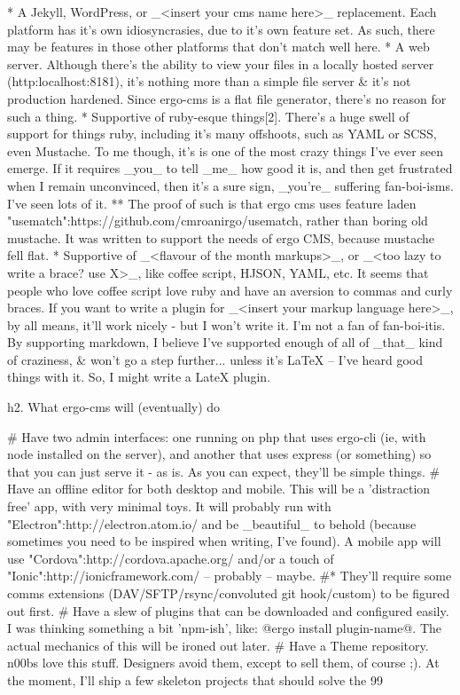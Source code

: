 * A Jekyll, WordPress, or _<insert your cms name here>_ replacement. Each platform has it's own idiosyncrasies, due to it's own feature set. As such, there may be features in those other platforms that don't match well here.
* A web server. Although there's the ability to view your files in a locally hosted server (http:localhost:8181), it's nothing more than a simple file server & it's not production hardened. Since ergo-cms is a flat file generator, there's no reason for such a thing.
* Supportive of ruby-esque things[2]. There's a huge swell of support for things ruby, including it's many offshoots, such as YAML or SCSS, even Mustache. To me though, it's is one of the most crazy things I've ever seen emerge. If it requires _you_ to tell _me_ how good it is, and then get frustrated when I remain unconvinced, then it's a sure sign, _you're_ suffering fan-boi-isms. I've seen lots of it.
** The proof of such is that ergo cms uses feature laden "usematch":https://github.com/cmroanirgo/usematch, rather than boring old mustache. It was written to support the needs of ergo CMS, because mustache fell flat.
* Supportive of _<flavour of the month markups>_, or _<too lazy to write a brace? use X>_, like coffee script, HJSON, YAML, etc. It seems that people who love coffee script love ruby and have an aversion to commas and curly braces. If you want to write a plugin for _<insert your markup language here>_, by all means, it'll work nicely - but I won't write it. I'm not a fan of fan-boi-itis. By supporting markdown, I believe I've supported enough of all of _that_ kind of craziness, & won't go a step further... unless it's LaTeX -- I've heard good things with it. So, I might write a LateX plugin. 



h2. What ergo-cms will (eventually) do

# Have two admin interfaces: one running on php that uses ergo-cli (ie, with node installed on the server), and another that uses express (or something) so that you can just serve it - as is. As you can expect, they'll be simple things.
# Have an offline editor for both desktop and mobile. This will be a 'distraction free' app, with very minimal toys. It will probably run with "Electron":http://electron.atom.io/ and be _beautiful_ to behold (because sometimes you need to be inspired when writing, I've found). A mobile app will use "Cordova":http://cordova.apache.org/ and/or a touch of "Ionic":http://ionicframework.com/ -- probably -- maybe. 
#* They'll require some comms extensions (DAV/SFTP/rsync/convoluted git hook/custom) to be figured out first.
# Have a slew of plugins that can be downloaded and configured easily. I was thinking something a bit 'npm-ish', like: @ergo install plugin-name@. The actual mechanics of this will be ironed out later.
# Have a Theme repository. n00bs love this stuff. Designers avoid them, except to sell them, of course ;). At the moment, I'll ship a few skeleton projects that should solve the 99%


